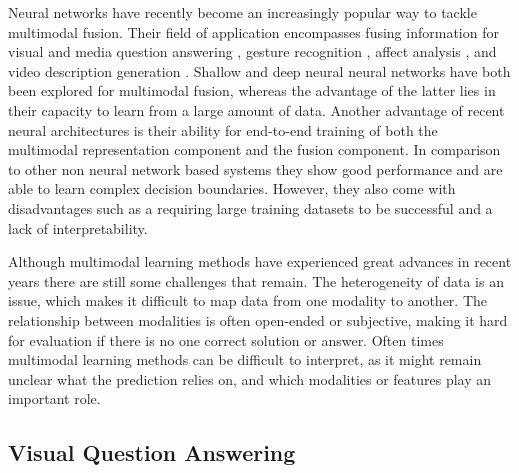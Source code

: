 \documentclass{article}
\begin{document}
Neural networks have recently become an increasingly popular way to tackle multimodal fusion. Their field of application encompasses fusing information for visual and media question answering \citep{gao2015are, malinowski2015ask, xu2016ask}, gesture recognition \citep{neverova2016moddrop}, affect analysis \citep{kahou2015EmoNets,nojavanasghari2016deep}, and video description generation \citep{jin2016video, venugopalan2016improving}. Shallow \citep{gao2015are} and deep \citep{nojavanasghari2016deep, venugopalan2016improving} neural neural networks have both been explored for multimodal fusion, whereas the advantage of the latter lies in their capacity to learn from a large amount of data. Another advantage of recent neural architectures is their ability for end-to-end training of both the multimodal representation component and the fusion component. In comparison to other non neural network based systems they show good performance and are able to learn complex decision boundaries. However, they also come with disadvantages such as a requiring large training datasets to be successful and a lack of interpretability. 

Although multimodal learning methods have experienced great advances in recent years there are still some challenges that remain. The heterogeneity of data is an issue, which makes it difficult to map data from one modality to another. The relationship between modalities is often open-ended or subjective, making it hard for evaluation if there is no one correct solution or answer. Often times multimodal learning methods can be difficult to interpret, as it might remain unclear what the prediction relies on, and which modalities or features play an important role.

\subsection{Visual Question Answering} \label{subsection:vqa}
\end{document}
